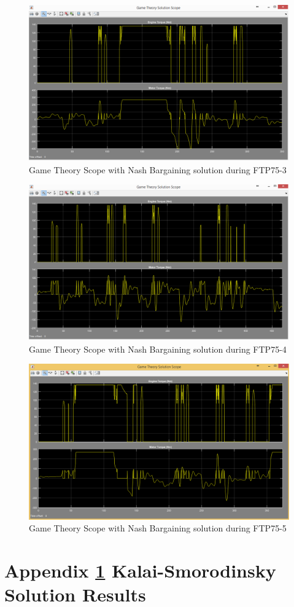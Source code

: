 \begin{figure}[h]
\centering
\includegraphics[scale=0.4]{figures/NashSolution/FTP75-3/gameTheory20Juni}
\caption{Game Theory Scope with Nash Bargaining solution during FTP75-3}
\label{fig:gtns1}
\end{figure}

\begin{figure}[h]
\centering
\includegraphics[scale=0.4]{figures/NashSolution/FTP75-4/gameTheory21Juni}
\caption{Game Theory Scope with Nash Bargaining solution during FTP75-4}
\label{fig:gtns1}
\end{figure}

\begin{figure}[h]
\centering
\includegraphics[scale=0.4]{figures/NashSolution/FTP75-5/gameTheory22Juni}
\caption{Game Theory Scope with Nash Bargaining solution during FTP75-5}
\label{fig:gtns1}
\end{figure}

\chapter{Appendix \ref{app:3} Kalai-Smorodinsky Solution Results}
\label{app:3}